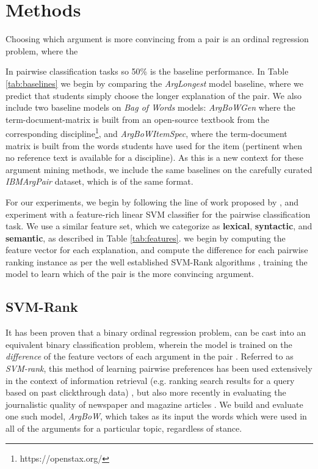 \documentclass[runningheads]{llncs}
\begin{document}
\section{Methods}
Choosing which argument is more convincing from a pair is an 
ordinal regression problem, where the 


In pairwise classification tasks so 50\% is the baseline performance.  
In Table \ref{tab:baselines} we begin by comparing the \textit{ArgLongest} 
model baseline, where we predict that students simply choose the longer 
explanation of the pair.
We also include two baseline models on \textit{Bag of Words} models: 
\textit{ArgBoWGen} where the term-document-matrix is built from an open-source 
textbook from the corresponding discipline\footnote{https://openstax.org/}, and 
\textit{ArgBoWItemSpec}, where the term-document matrix is built from the words 
students have used for the item (pertinent when no reference text is available 
for a discipline).
As this is a new context for these argument mining methods, we include the same 
baselines on the carefully curated \textit{IBMArgPair} dataset, which is of the 
same format.



For our experiments, we begin by following the line of work proposed by 
\cite{habernal_which_2016}, and experiment with a feature-rich linear SVM 
classifier for the pairwise classification task. We use a similar feature set, 
which we categorize as \textbf{lexical}, \textbf{syntactic}, and 
\textbf{semantic}, as described in Table \ref{tab:features}. we begin by 
computing the feature vector for each explanation, and compute the difference 
for each pairwise ranking instance as per the well established SVM-Rank 
algorithms \cite{joachims_optimizing_2002}, training the model to learn which 
of the pair is the more convincing argument. 



\subsection{SVM-Rank}
It has been proven that a binary ordinal regression problem, can be cast into 
an equivalent binary classification problem, wherein the model is trained on 
the \textit{difference} of the feature vectors of each argument in the pair 
\cite{herbrich_support_1999}. Referred to as \textit{SVM-rank}, this method of 
learning pairwise preferences has been used extensively in the context of 
information retrieval (e.g. ranking search results for a query based on past 
clickthrough data) \cite{joachims_optimizing_2002}, but also more recently in 
evaluating the journalistic quality of newspaper and magazine articles 
\cite{louis_what_2013}. We build and evaluate one such model, \textit{ArgBoW}, 
which takes as its input the words which were used in all of the arguments for 
a particular topic, regardless of stance. 
\end{document}
